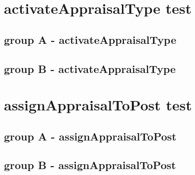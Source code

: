 \documentclass[a4paper,11pt]{article}
\begin{document}
\newpage
\section{activateAppraisalType test}
\subsection{group A - activateAppraisalType}

\subsection{group B - activateAppraisalType}



\newpage
\section{assignAppraisalToPost test}
\subsection{group A - assignAppraisalToPost}

\subsection{group B - assignAppraisalToPost}
\end{document}
